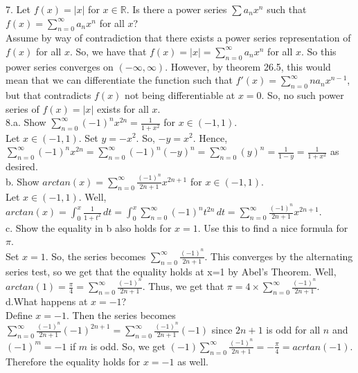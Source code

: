\documentclass[12pt]{article}
\begin{document}
7. Let $f(x)=|x|$ for $x\in\mathbb{R}$. Is there a power series $\sum a_nx^n$ such that $f(x)=\sum_{n=0}^{\infty} a_nx^n$ for all $x$?\\
Assume by way of contradiction that there exists a power series representation of $f(x)$ for all $x$. So, we have that $f(x)=|x|=\sum_{n=0}^{\infty} a_nx^n$ for all $x$. So this power series converges on $(-\infty,\infty)$. However, by theorem 26.5, this would mean that we can differentiate the function such that $f'(x)=\sum_{n=0}^{\infty} na_nx^{n-1}$, but that contradicts $f(x)$ not being differentiable at $x=0$. So, no such power series of $f(x)=|x|$ exists for all $x$.\\

8.a. Show $\sum_{n=0}^{\infty}(-1)^nx^{2n}=\frac{1}{1+x^2}$ for $x\in(-1,1)$.\\
Let $x\in(-1,1)$. Set $y=-x^2$. So, $-y=x^2$. Hence, $\sum_{n=0}^{\infty}(-1)^nx^{2n}=\sum_{n=0}^{\infty}(-1)^n(-y)^{n}=\sum_{n=0}^{\infty}(y)^n=\frac{1}{1-y}=\frac{1}{1+x^2}$ as desired.\\
b. Show $arctan(x)=\sum_{n=0}^{\infty}\frac{(-1)^n}{2n+1}x^{2n+1}$ for $x\in(-1,1)$.\\
Let $x\in(-1,1)$. Well, $arctan(x)=\int_{0}^{x}\frac{1}{1+t^2}\,dt=\int_{0}^{x}\sum_{n=0}^{\infty}(-1)^nt^{2n}\,dt=\sum_{n=0}^{\infty}\frac{(-1)^n}{2n+1}x^{2n+1}$.\\
c. Show the equality in b also holds for $x=1$. Use this to find a nice formula for $\pi$.\\
Set $x=1$. So, the series becomes $\sum_{n=0}^{\infty}\frac{(-1)^n}{2n+1}$. This converges by the alternating series test, so we get that the equality holds at x=1 by Abel's Theorem. Well, $arctan(1)=\frac{\pi}{4}=\sum_{n=0}^{\infty}\frac{(-1)^n}{2n+1}$. Thus, we get that $\pi=4\times\sum_{n=0}^{\infty}\frac{(-1)^n}{2n+1}$.\\
d.What happens at $x=-1$?\\
Define $x=-1$. Then the series becomes $\sum_{n=0}^{\infty}\frac{(-1)^n}{2n+1}(-1)^{2n+1}=\sum_{n=0}^{\infty}\frac{(-1)^n}{2n+1}(-1)$ since $2n+1$ is odd for all $n$ and $(-1)^m=-1$ if $m$ is odd. So, we get $(-1)\sum_{n=0}^{\infty}\frac{(-1)^n}{2n+1}=-\frac{\pi}{4}=acrtan(-1)$. Therefore the equality holds for $x=-1$ as well.\\
\end{document}
